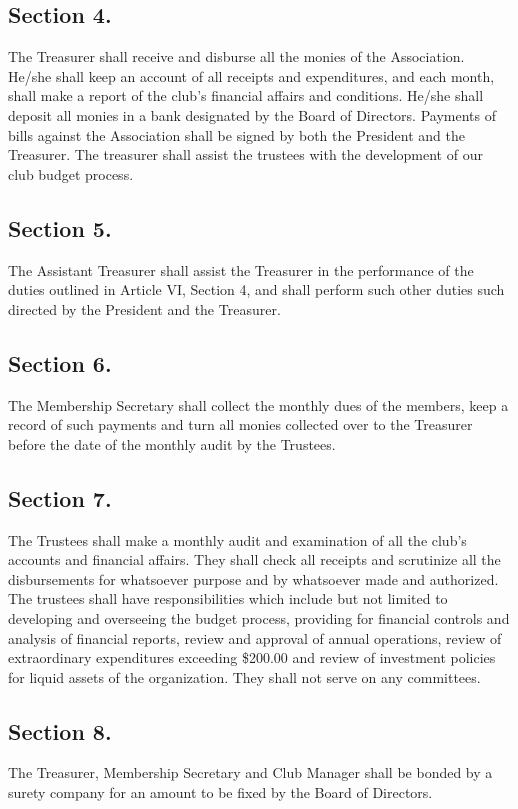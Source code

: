 \documentclass[12pt,letterpaper]{article}
\begin{document}
\subsection*{Section 4.} The Treasurer shall receive and disburse all the monies of the Association.
He/she shall keep an account of all receipts and expenditures, and each month, shall
make a report of the club’s financial affairs and conditions. He/she shall deposit all
monies in a bank designated by the Board of Directors. Payments of bills against the
Association shall be signed by both the President and the Treasurer. The treasurer shall
assist the trustees with the development of our club budget process.
\subsection*{Section 5.} The Assistant Treasurer shall assist the Treasurer in the performance of the
duties outlined in Article VI, Section 4, and shall perform such other duties such directed
by the President and the Treasurer.
\subsection*{Section 6.} The Membership Secretary shall collect the monthly dues of the members,
keep a record of such payments and turn all monies collected over to the Treasurer
before the date of the monthly audit by the Trustees.
\subsection*{Section 7.} The Trustees shall make a monthly audit and examination of all the club’s
accounts and financial affairs. They shall check all receipts and scrutinize all the
disbursements for whatsoever purpose and by whatsoever made and authorized. The
trustees shall have responsibilities which include but not limited to developing and
overseeing the budget process, providing for financial controls and analysis of financial
reports, review and approval of annual operations, review of extraordinary expenditures
exceeding \$200.00 and review of investment policies for liquid assets of the
organization. They shall not serve on any committees.
\subsection*{Section 8.} The Treasurer, Membership Secretary and Club Manager shall be bonded
by a surety company for an amount to be fixed by the Board of Directors.
\end{document}

